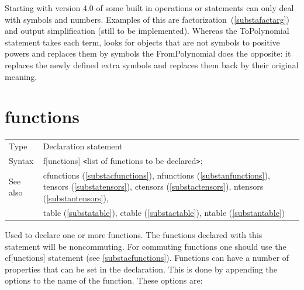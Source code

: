 \noindent Starting with version 4.0 of \FORM{} some built in operations or
statements can only deal with symbols and numbers. Examples of this are 
factorization~(\ref{substafactarg}) and output simplification (still to be 
implemented). Whereas the ToPolynomial statement takes each term, looks for objects 
that are not symbols to positive powers and replaces them by symbols the 
FromPolynomial does the opposite: it replaces the newly defined extra 
symbols and replaces them back by their original meaning.
\vspace{10mm}

 
\section{functions}
\label{substafunctions}

\noindent \begin{tabular}{ll}
Type & Declaration statement\\
Syntax & f[unctions] {\tt<}list of functions to be declared{\tt>}; \\
See also & cfunctions (\ref{substacfunctions}),
           nfunctions (\ref{substanfunctions}),
           tensors (\ref{substatensors}),
           ctensors (\ref{substactensors}),
           ntensors (\ref{substantensors}), \\ &
           table (\ref{substatable}),
           ctable (\ref{substactable}),
           ntable (\ref{substantable})
\end{tabular} \vspace{4mm}

\noindent Used to declare one or more functions. The functions declared 
with this statement will be noncommuting. For 
commuting functions one 
should use the cf[unctions] statement (see \ref{substacfunctions}). 
Functions can have a number of properties that can be set in the 
declaration. This is done by appending the options to the name of the 
function. These options are:



